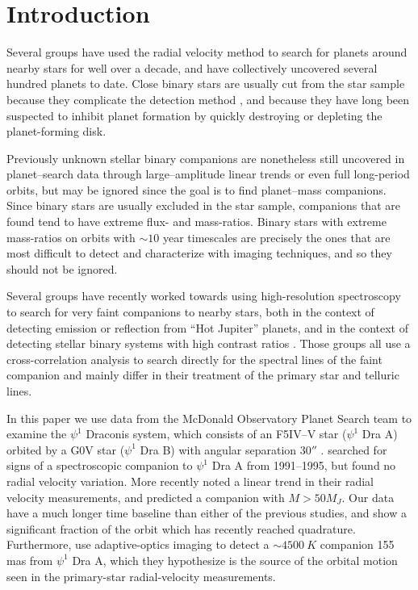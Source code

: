 

\section{Introduction}
\label{paper4_sec:intro}
Several groups \citep[e.g.][]{Wittenmyer2006, Fischer2009, Pepe2011} have used the radial velocity method to search for planets around nearby stars for well over a decade, and have collectively uncovered several hundred planets to date. Close binary stars are usually cut from the star sample because they complicate the detection method \citep[e.g.][]{Bergmann2015}, and because they have long been suspected to inhibit planet formation by quickly destroying \citep{Kraus2012} or depleting \citep{Harris2012} the planet-forming disk.

Previously unknown stellar binary companions are nonetheless still uncovered in planet--search data through large--amplitude linear trends or even full long-period orbits, but may be ignored since the goal is to find planet--mass companions. Since binary stars are usually excluded in the star sample, companions that are found tend to have extreme flux- and mass-ratios. Binary stars with extreme mass-ratios on orbits with $\sim 10$ year timescales are precisely the ones that are most difficult to detect and characterize with imaging techniques, and so they should not be ignored.

Several groups have recently worked towards using high-resolution spectroscopy to search for very faint companions to nearby stars, both in the context of detecting emission \citep{Snellen2010, Gullikson2013} or reflection \citep{Martins2013} from ``Hot Jupiter'' planets, and in the context of detecting stellar binary systems with high contrast ratios \citep[e.g.][]{Gullikson2013_2, Kolbl2015}. Those groups all use a cross-correlation analysis to search directly for the spectral lines of the faint companion and mainly differ in their treatment of the primary star and telluric lines.

In this paper we use data from the McDonald Observatory Planet Search team to examine the $\psi^1$ Draconis system, which consists of an F5IV--V star ($\psi^1$ Dra A) orbited by a G0V star ($\psi^1$ Dra B) with angular separation $30''$ \citep{WDS}. \cite{Tokovinin2002} searched for signs of a spectroscopic companion to $\psi^1$ Dra A from 1991--1995, but found no radial velocity variation. More recently \cite{Toyota2009} noted a linear trend in their radial velocity measurements, and predicted a companion with $M > 50 M_J$. Our data have a much longer time baseline than either of the previous studies, and show a significant fraction of the orbit which has recently reached quadrature. Furthermore, \citet{Endl2015} use adaptive-optics imaging to detect a $\sim 4500\ K$ companion 155 mas from $\psi^1$ Dra A, which they hypothesize is the source of the orbital motion seen in the primary-star radial-velocity measurements. 

